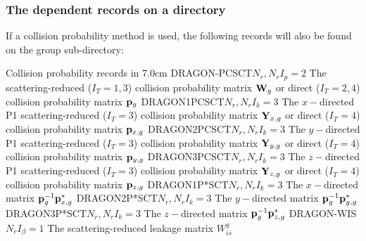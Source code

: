 \vskip -0.5cm

\subsubsection{The  dependent records on a
 directory}\label{sect:traficgrpdiringdir}

If a collision probability method is used, the following records will also be
found on the group sub-directory:

\begin{DescriptionEnregistrement}{Collision probability records in }{7.0cm}
\OptRealEnr
  {DRAGON-PCSCT}{$N_{r},N_{r}$}{$I_{p}=2$}{} 
  {The scattering-reduced ($I_{T}=1,3$)  collision probability matrix ${\bf W}_{g}$ or direct
   ($I_{T}=2,4$) collision probability matrix ${\bf p}_{g}$}
\OptRealEnr
  {DRAGON1PCSCT}{$N_{r},N_{r}$}{$I_{k}=3$}{} 
{The $x-$directed P1 scattering-reduced ($I_{T}=3$) collision probability matrix ${\bf Y}_{x,g}$
   or direct ($I_{T}=4$) collision probability matrix ${\bf p}_{x,g}$}
\OptRealEnr
  {DRAGON2PCSCT}{$N_{r},N_{r}$}{$I_{k}=3$}{} 
  {The $y-$directed P1 scattering-reduced ($I_{T}=3$) collision probability matrix ${\bf Y}_{y,g}$
   or direct ($I_{T}=4$) collision probability matrix ${\bf p}_{y,g}$}
\OptRealEnr
  {DRAGON3PCSCT}{$N_{r},N_{r}$}{$I_{k}=3$}{} 
  {The $z-$directed P1 scattering-reduced ($I_{T}=3$) collision probability matrix ${\bf Y}_{z,g}$
   or direct ($I_{T}=4$) collision probability matrix ${\bf p}_{z,g}$}
\OptRealEnr
  {DRAGON1P*SCT}{$N_{r},N_{r}$}{$I_{k}=3$}{} 
  {The $x-$directed matrix ${\bf p}_g^{-1}{\bf p}_{x,g}^*$}
\OptRealEnr
  {DRAGON2P*SCT}{$N_{r},N_{r}$}{$I_{k}=3$}{} 
  {The $y-$directed matrix ${\bf p}_g^{-1}{\bf p}_{y,g}^*$}
\OptRealEnr
  {DRAGON3P*SCT}{$N_{r},N_{r}$}{$I_{k}=3$}{} 
  {The $z-$directed matrix ${\bf p}_g^{-1}{\bf p}_{z,g}^*$}
\OptRealEnr
  {DRAGON-WIS}{$N_{r}$}{$I_{\beta}=1$}{} 
  {The scattering-reduced leakage matrix $W_{is}^{g}$ }
\end{DescriptionEnregistrement}

